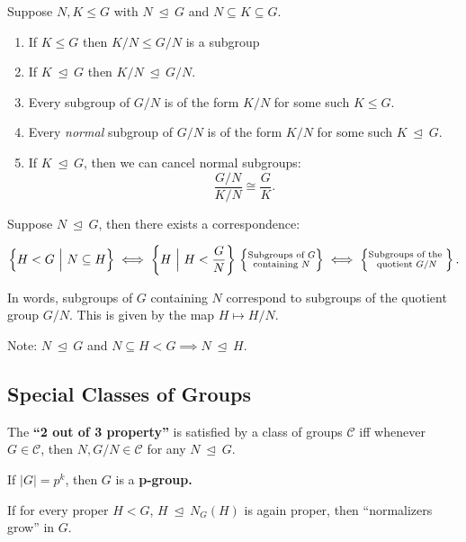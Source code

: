 Suppose \(N, K \leq G\) with \(N {~\trianglelefteq~}G\) and
\(N\subseteq K \subseteq G\).

\begin{enumerate}
\def\labelenumi{\arabic{enumi}.}
\tightlist
\item
  If \(K\leq G\) then \(K/N \leq G/N\) is a subgroup
\item
  If \(K{~\trianglelefteq~}G\) then \(K/N {~\trianglelefteq~}G/N\).
\item
  Every subgroup of \(G/N\) is of the form \(K/N\) for some such
  \(K \leq G\).
\item
  Every \emph{normal} subgroup of \(G/N\) is of the form \(K/N\) for
  some such \(K {~\trianglelefteq~}G\).
\item
  If \(K{~\trianglelefteq~}G\), then we can cancel normal subgroups:
  \[  
  \frac{G/N}{K/N} \cong \frac{G}{K}
  .\]
\end{enumerate}

Suppose \(N {~\trianglelefteq~}G\), then there exists a correspondence:

\[  
\left\{
H < G {~\mathrel{\Big|}~}N \subseteq H
\right\}
\iff
\left\{
H {~\mathrel{\Big|}~}H < \frac G N
\right\}
\\
\left\{{\substack{
  \text{Subgroups of $G$} \\
  \text{containing $N$}
}}\right\} \iff
\left\{{\substack{
  \text{Subgroups of the } \\
  \text{quotient $G/N$}
}}\right\}
.\]

In words, subgroups of \(G\) containing \(N\) correspond to subgroups of
the quotient group \(G/N\). This is given by the map \(H \mapsto H/N\).

Note: \(N {~\trianglelefteq~}G\) and
\(N \subseteq H < G \implies N {~\trianglelefteq~}H\).

\hypertarget{special-classes-of-groups}{%
\subsection{Special Classes of Groups}\label{special-classes-of-groups}}

The \textbf{``2 out of 3 property''} is satisfied by a class of groups
\(\mathcal{C}\) iff whenever \(G \in \mathcal{C}\), then
\(N, G/N \in \mathcal{C}\) for any \(N {~\trianglelefteq~}G\).

If \({\left\lvert {G} \right\rvert} = p^k\), then \(G\) is a
\textbf{p-group.}

If for every proper \(H<G\), \(H{~\trianglelefteq~}N_G(H)\) is again
proper, then ``normalizers grow'' in \(G\).

